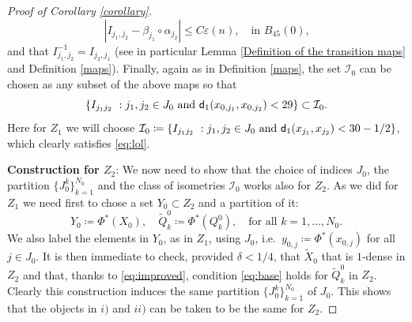 \documentclass[11pt]{article}
\newcommand{\eps}{\varepsilon}
\newcommand{\sfd}{{\sf d}}
\theoremstyle{plain}
\theoremstyle{definition}
\numberwithin{equation}{section}
\begin{document}
\begin{proof}[Proof of Corollary \ref{corollary}]
\begin{equation}\label{eq:isom prop}
    |I_{j_1,j_2}-\beta_{j_1}\circ\alpha_{j_2}|\le C\eps(n), \quad \text{in $B_{45}(0)$,}
\end{equation}
and that $I_{j_1,j_2}^{-1}=I_{j_2,j_1}$ (see in particular Lemma \ref{Definition of the transition maps} and Definition \ref{maps}).
Finally, again as in Definition \ref{maps}, the set $\mathcal I_0$ can  be chosen as any subset of the above maps so that
\begin{equation}\label{eq:lol}
   \{I_{j_1j_2}\ : j_1,j_2 \in J_0 \text{ and }\sfd_1(x_{0,j_1},x_{0,j_2})<29\}\subset   \mathcal I_0.
 \end{equation}
 Here for $Z_1$ we will choose $ \mathcal I_0\coloneqq  \{I_{j_1j_2}\ : j_1,j_2 \in J_0 \text{ and }\sfd_1(x_{j_1},x_{j_2})<30-1/2\}$, which clearly satisfies \eqref{eq:lol}. 

\textbf{Construction for $Z_2$}: We now need to show that the choice of indices $J_0$, the partition $\{J_0^k\}_{k=1}^{N_0}$ and  the class of isometries $\mathcal I_0$ works also for $Z_2$. As we did for $Z_1$ we need first to chose a set $Y_0\subset Z_2$ and a partition of it:
\[
Y_0\coloneqq \Phi^*(X_0), \quad \tilde Q^0_k\coloneqq \Phi^*(Q^0_k), \quad \text{for all $k=1,\dots,N_0$}.
\]
We also label the elements in $Y_0$, as in $Z_1$, using $J_0$, i.e.\ $y_{0,j}\coloneqq \Phi^*(x_{0,j})$ for all $j \in J_0.$
It is then immediate to check, provided $\delta <1/4$, that $\tilde X_0$ that is $1$-dense in $Z_2$ and that, thanks to \eqref{eq:improved}, condition \eqref{eq:base} holds for $\tilde Q^0_k$ in $Z_2$. Clearly this construction induces the same  partition $\{J_0^k\}_{k=1}^{N_0}$  of $J_0.$ This shows that the objects in $i)$ and $ii)$ can be taken to be the same for $Z_2.$


\end{proof}
\end{document}
